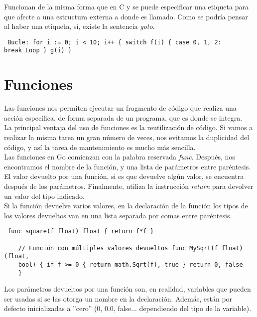 Funcionan de la misma forma que en C y se puede especificar una etiqueta para
que afecte a una estructura externa a donde es llamado. Como se podría pensar al
haber una etiqueta, sí, existe la sentencia \textit{goto}.

\begin{verbatim} Bucle: for i := 0; i < 10; i++ { switch f(i) { case 0, 1, 2:
break Loop } g(i) } \end{verbatim}

\section{Funciones\label{funciones}}

Las funciones nos permiten ejecutar un fragmento de código que realiza una
acción específica, de forma separada de un programa, que es donde se integra.\\

La principal ventaja del uso de funciones es la reutilización de código. Si
vamos a realizar la misma tarea un gran número de veces, nos evitamos la
duplicidad del código, y así la tarea de mantenimiento es mucho más sencilla.\\

Las funciones en Go comienzan con la palabra reservada \textit{func}. Después,
nos encontramos el nombre de la función, y una lista de parámetros entre
paréntesis. El valor devuelto por una función, si es que devuelve algún valor,
se encuentra después de los parámetros. Finalmente, utiliza la instrucción
\textit{return} para devolver un valor del tipo indicado.\\

Si la función devuelve varios valores, en la declaración de la función los tipos
de los valores devueltos van en una lista separada por comas entre paréntesis.

\begin{verbatim} func square(f float) float { return f*f }
    
	// Función con múltiples valores devueltos func MySqrt(f float) (float,
	bool) { if f >= 0 { return math.Sqrt(f), true } return 0, false
	}    \end{verbatim}

Los parámetros devueltos por una función son, en realidad, variables que pueden
ser usadas si se las otorga un nombre en la declaración. Además, están por
defecto inicializadas a ''cero'' (0, 0.0, false... dependiendo del tipo de la
variable).

